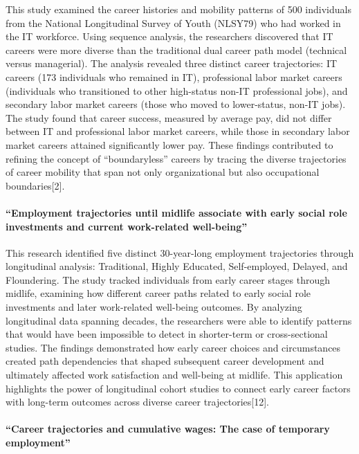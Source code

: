 \documentclass[./main.tex]{subfiles}
\begin{document}
This study examined the career histories and mobility patterns of 500
individuals from the National Longitudinal Survey of Youth (NLSY79) who
had worked in the IT workforce. Using sequence analysis, the researchers
discovered that IT careers were more diverse than the traditional dual
career path model (technical versus managerial). The analysis revealed
three distinct career trajectories: IT careers (173 individuals who
remained in IT), professional labor market careers (individuals who
transitioned to other high-status non-IT professional jobs), and
secondary labor market careers (those who moved to lower-status, non-IT
jobs). The study found that career success, measured by average pay, did
not differ between IT and professional labor market careers, while those
in secondary labor market careers attained significantly lower pay.
These findings contributed to refining the concept of ``boundaryless''
careers by tracing the diverse trajectories of career mobility that span
not only organizational but also occupational boundaries{[}2{]}.

\paragraph{``Employment trajectories until midlife associate with
early social role investments and current work-related
well-being''}\label{employment-trajectories-until-midlife-associate-with-early-social-role-investments-and-current-work-related-well-being}

This research identified five distinct 30-year-long employment
trajectories through longitudinal analysis: Traditional, Highly
Educated, Self-employed, Delayed, and Floundering. The study tracked
individuals from early career stages through midlife, examining how
different career paths related to early social role investments and
later work-related well-being outcomes. By analyzing longitudinal data
spanning decades, the researchers were able to identify patterns that
would have been impossible to detect in shorter-term or cross-sectional
studies. The findings demonstrated how early career choices and
circumstances created path dependencies that shaped subsequent career
development and ultimately affected work satisfaction and well-being at
midlife. This application highlights the power of longitudinal cohort
studies to connect early career factors with long-term outcomes across
diverse career trajectories{[}12{]}.

\paragraph{``Career trajectories and cumulative wages: The case of
temporary
employment''}\label{career-trajectories-and-cumulative-wages-the-case-of-temporary-employment}
\end{document}
